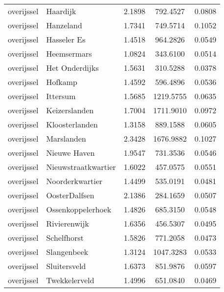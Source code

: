\begin{longtable}{llccc}
	overijssel    & Haardijk                         & 2.1898  & 792.4527  & 0.0808          \\
	overijssel    & Hanzeland                        & 1.7341  & 749.5714  & 0.1052          \\
	overijssel    & Hasseler Es                      & 1.4518  & 964.2826  & 0.0549          \\
	overijssel    & Heemsermars                      & 1.0824  & 343.6100  & 0.0514          \\
	overijssel    & Het Onderdijks                   & 1.5631  & 310.5288  & 0.0378          \\
	overijssel    & Hofkamp                          & 1.4592  & 596.4896  & 0.0536          \\
	overijssel    & Ittersum                         & 1.5685  & 1219.5755 & 0.0635          \\
	overijssel    & Keizerslanden                    & 1.7004  & 1711.9010 & 0.0972          \\
	overijssel    & Kloosterlanden                   & 1.3158  & 889.1588  & 0.0605          \\
	overijssel    & Marslanden                       & 2.3428  & 1676.9882 & 0.1027          \\
	overijssel    & Nieuwe Haven                     & 1.9547  & 731.3536  & 0.0546          \\
	overijssel    & Nieuwstraatkwartier              & 1.6022  & 457.0575  & 0.0551          \\
	overijssel    & Noorderkwartier                  & 1.4499  & 535.0191  & 0.0481          \\
	overijssel    & OosterDalfsen                    & 2.1386  & 284.1659  & 0.0507          \\
	overijssel    & Ossenkoppelerhoek                & 1.4826  & 685.3150  & 0.0548          \\
	overijssel    & Rivierenwijk                     & 1.6356  & 456.5307  & 0.0495          \\
	overijssel    & Schelfhorst                      & 1.5826  & 771.2058  & 0.0473          \\
	overijssel    & Slangenbeek                      & 1.3124  & 1047.3283 & 0.0533          \\
	overijssel    & Sluitersveld                     & 1.6373  & 851.9876  & 0.0597          \\
	overijssel    & Twekkelerveld                    & 1.4996  & 651.0840  & 0.0469          \\

\end{longtable}
